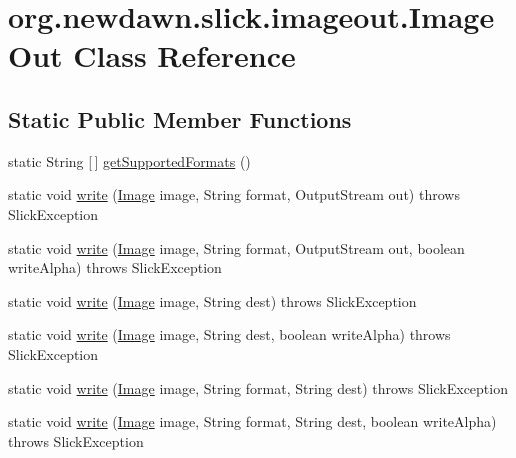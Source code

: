 \hypertarget{classorg_1_1newdawn_1_1slick_1_1imageout_1_1_image_out}{}\section{org.\+newdawn.\+slick.\+imageout.\+Image\+Out Class Reference}
\label{classorg_1_1newdawn_1_1slick_1_1imageout_1_1_image_out}
\subsection*{Static Public Member Functions}
\begin{DoxyCompactItemize}
\item 
static String \mbox{[}$\,$\mbox{]} \mbox{\hyperlink{classorg_1_1newdawn_1_1slick_1_1imageout_1_1_image_out_a5f0e565089362d9df4c3cf11c6f52445}{get\+Supported\+Formats}} ()
\item 
static void \mbox{\hyperlink{classorg_1_1newdawn_1_1slick_1_1imageout_1_1_image_out_a3b5d59b0d7fbacc07f04a2e3c687cd74}{write}} (\mbox{\hyperlink{classorg_1_1newdawn_1_1slick_1_1_image}{Image}} image, String format, Output\+Stream out)  throws Slick\+Exception 
\item 
static void \mbox{\hyperlink{classorg_1_1newdawn_1_1slick_1_1imageout_1_1_image_out_a1919735506d349b80950072af1cd144e}{write}} (\mbox{\hyperlink{classorg_1_1newdawn_1_1slick_1_1_image}{Image}} image, String format, Output\+Stream out, boolean write\+Alpha)  throws Slick\+Exception 
\item 
static void \mbox{\hyperlink{classorg_1_1newdawn_1_1slick_1_1imageout_1_1_image_out_a882977334716c5207011a3606c8e0b56}{write}} (\mbox{\hyperlink{classorg_1_1newdawn_1_1slick_1_1_image}{Image}} image, String dest)  throws Slick\+Exception 
\item 
static void \mbox{\hyperlink{classorg_1_1newdawn_1_1slick_1_1imageout_1_1_image_out_a4fb9c013b521ae23b30074fb75a5da24}{write}} (\mbox{\hyperlink{classorg_1_1newdawn_1_1slick_1_1_image}{Image}} image, String dest, boolean write\+Alpha)  throws Slick\+Exception 
\item 
static void \mbox{\hyperlink{classorg_1_1newdawn_1_1slick_1_1imageout_1_1_image_out_a85927f3db76e9a4ce353a44d5fb12b6d}{write}} (\mbox{\hyperlink{classorg_1_1newdawn_1_1slick_1_1_image}{Image}} image, String format, String dest)  throws Slick\+Exception 
\item 
static void \mbox{\hyperlink{classorg_1_1newdawn_1_1slick_1_1imageout_1_1_image_out_a982565477e5540db4af99348e0543616}{write}} (\mbox{\hyperlink{classorg_1_1newdawn_1_1slick_1_1_image}{Image}} image, String format, String dest, boolean write\+Alpha)  throws Slick\+Exception 
\end{DoxyCompactItemize}
